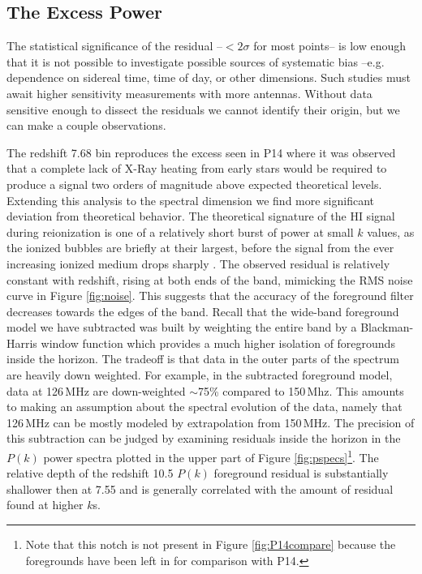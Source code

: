 \documentclass[preprint2]{aastex}
\begin{document}
\subsection{The Excess Power}
\label{sec:excess power}
  The statistical significance of the residual --$<2\sigma$ for most points-- is low enough that it is not possible to investigate possible sources of systematic bias --e.g. dependence on sidereal time, time of day, or other dimensions.  Such studies must await higher sensitivity measurements with more antennas. Without data sensitive enough to dissect the residuals we cannot identify their origin, but we can make a couple observations. 


The redshift 7.68 bin reproduces the excess seen in P14 where it was observed that a complete lack of X-Ray heating from early stars would be required to produce a signal two orders of magnitude above expected theoretical levels.  Extending this analysis to the spectral dimension we find more significant deviation from theoretical behavior.  The theoretical signature of the HI signal during reionization is one of a relatively short burst of power at small $k$ values, as the ionized bubbles are briefly at their largest, before the signal from the ever increasing ionized medium drops sharply \citep{Pritchard:2008p8123}.  The observed residual is relatively constant with redshift, rising at both ends of the band, mimicking the RMS noise curve in Figure \ref{fig:noise}.  This suggests that the accuracy of the foreground filter decreases towards the edges of the band.  Recall that the wide-band foreground model we have subtracted was built by weighting the entire band by a Blackman-Harris window function which provides a much higher isolation of foregrounds inside the horizon. The tradeoff is that data in the outer parts of the spectrum are heavily down weighted.  For example, in the subtracted foreground model, data at 126\,MHz are down-weighted $\sim$75\% compared to 150\,Mhz.  This amounts to making an assumption about the spectral evolution of the data, namely that 126\,MHz can be mostly modeled by extrapolation from 150\,MHz.  The precision of this subtraction can be judged by examining residuals inside the horizon in the $P(k)$ power spectra plotted in the upper part of Figure \ref{fig:pspecs}\footnote{Note that this notch is not present in Figure \ref{fig:P14compare} because the foregrounds have been left in for comparison with P14.}.  The relative depth of the redshift 10.5 $P(k)$ foreground residual is substantially shallower then at 7.55 and is generally correlated with the amount of residual found at higher $k$s.
\end{document}
